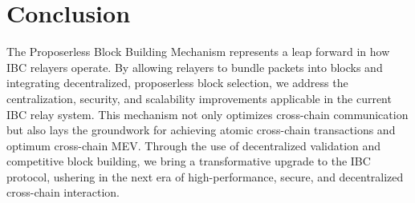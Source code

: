 \documentclass{article}
\begin{document}
\section*{Conclusion}

The Proposerless Block Building Mechanism represents a leap forward in how IBC relayers operate. By allowing relayers to bundle packets into blocks and integrating decentralized, proposerless block selection, we address the centralization, security, and scalability improvements applicable in the current IBC relay system. This mechanism not only optimizes cross-chain communication but also lays the groundwork for achieving atomic cross-chain transactions and optimum cross-chain MEV. Through the use of decentralized validation and competitive block building, we bring a transformative upgrade to the IBC protocol, ushering in the next era of high-performance, secure, and decentralized cross-chain interaction.
\end{document}
